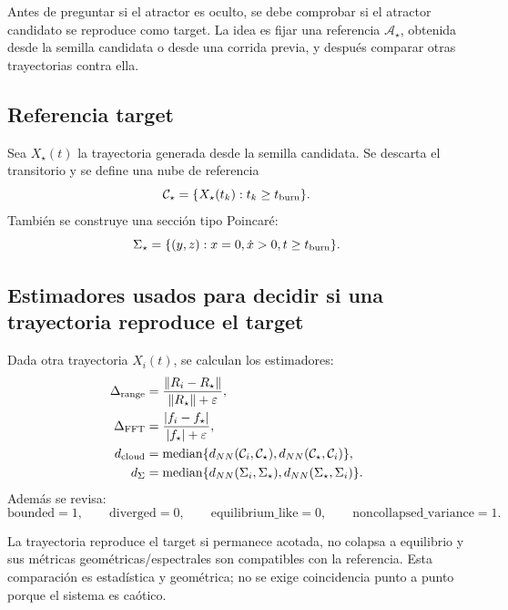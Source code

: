 \documentclass[11pt]{article}
\begin{document}
Antes de preguntar si el atractor es oculto, se debe comprobar si el atractor candidato se reproduce como target. La idea es fijar una referencia \(\mathcal A_\star\), obtenida desde la semilla candidata o desde una corrida previa, y después comparar otras trayectorias contra ella.

\subsection{Referencia target}

Sea \(X_\star(t)\) la trayectoria generada desde la semilla candidata. Se descarta el transitorio y se define una nube de referencia
\begin{equation}
\mathcal C_\star=\{X_\star(t_k):t_k\ge t_{\rm burn}\}.
\end{equation}
También se construye una sección tipo Poincaré:
\begin{equation}
\Sigma_\star=\{(y,z):x=0,\dot x>0,t\ge t_{\rm burn}\}.
\end{equation}

\subsection{Estimadores usados para decidir si una trayectoria reproduce el target}

Dada otra trayectoria \(X_i(t)\), se calculan los estimadores:
\begin{align}
\Delta_{\rm range}&=\frac{\|R_i-R_\star\|}{\|R_\star\|+\varepsilon},\\
\Delta_{\rm FFT}&=\frac{|f_i-f_\star|}{|f_\star|+\varepsilon},\\
d_{\rm cloud}&=\operatorname{median}\{d_{NN}(\mathcal C_i,\mathcal C_\star),d_{NN}(\mathcal C_\star,\mathcal C_i)\},\\
d_{\Sigma}&=\operatorname{median}\{d_{NN}(\Sigma_i,\Sigma_\star),d_{NN}(\Sigma_\star,\Sigma_i)\}.
\end{align}
Además se revisa:
\begin{equation}
\text{bounded}=1,
\qquad
\text{diverged}=0,
\qquad
\text{equilibrium\_like}=0,
\qquad
\text{noncollapsed\_variance}=1.
\end{equation}

La trayectoria reproduce el target si permanece acotada, no colapsa a equilibrio y sus métricas geométricas/espectrales son compatibles con la referencia. Esta comparación es estadística y geométrica; no se exige coincidencia punto a punto porque el sistema es caótico.
\end{document}
